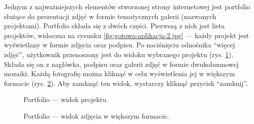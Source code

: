 \documentclass[a4paper, 12pt]{article}
\numberwithin{figure}{section}
\begin{document}
\begin{sloppypar}
Jednym z najważniejszych elementów stworzonej strony internetowej jest portfolio służące do prezentacji zdjęć w formie tematycznych galerii (nazwanych projektami). Portfolio składa się z dwóch części. Pierwszą z nich jest lista projektów, widoczna na rysunku \ref{fig:gotowa-aplikacja-2.jpg} --- każdy projekt jest wyświetlany w formie zdjęcia oraz podpisu. Po naciśnięciu odnośnika ``więcej zdjęć'', użytkownik przenoszony jest do widoku wybranego projektu (rys. \ref{fig:gotowa-aplikacja-3.jpg}). Składa się on z nagłówka, podpisu oraz galerii zdjęć w formie dwukolumnowej mozaiki. Każdą fotografię można kliknąć w celu wyświetlenia jej w większym formacie (rys. \ref{fig:gotowa-aplikacja-4.jpg}). Aby zamknąć ten widok, wystarczy kliknąć przycisk ``zamknij''. 

\begin{figure}[H] 
    \centering
   \caption{Portfolio --- widok projektu.}
   \label{fig:gotowa-aplikacja-3.jpg}
\end{figure}

\begin{figure}[H] 
    \centering
   \caption{Portfolio --- widok zdjęcia w większym formacie.}
   \vspace{-4mm}
   \label{fig:gotowa-aplikacja-4.jpg}
\end{figure}


\end{sloppypar}
\end{document}
